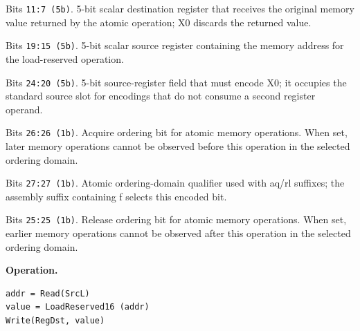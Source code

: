 \begin{description}[leftmargin=0.18\linewidth,style=nextline]
\item[\texttt{RegDst}] Bits \texttt{11:7 (5b)}. 5-bit scalar destination register that receives the original memory value returned by the atomic operation; X0 discards the returned value.
\item[\texttt{SrcL}] Bits \texttt{19:15 (5b)}. 5-bit scalar source register containing the memory address for the load-reserved operation.
\item[\texttt{SrcZero}] Bits \texttt{24:20 (5b)}. 5-bit source-register field that must encode X0; it occupies the standard source slot for encodings that do not consume a second register operand.
\item[\texttt{aq}] Bits \texttt{26:26 (1b)}. Acquire ordering bit for atomic memory operations. When set, later memory operations cannot be observed before this operation in the selected ordering domain.
\item[\texttt{far}] Bits \texttt{27:27 (1b)}. Atomic ordering-domain qualifier used with aq/rl suffixes; the assembly suffix containing f selects this encoded bit.
\item[\texttt{rl}] Bits \texttt{25:25 (1b)}. Release ordering bit for atomic memory operations. When set, earlier memory operations cannot be observed after this operation in the selected ordering domain.
\end{description}
\noindent\textbf{Operation.}\par
\begin{lstlisting}[style=ptoscalarcode]
addr = Read(SrcL)
value = LoadReserved16 (addr)
Write(RegDst, value)
\end{lstlisting}
\Needspace{0.08\textheight}
